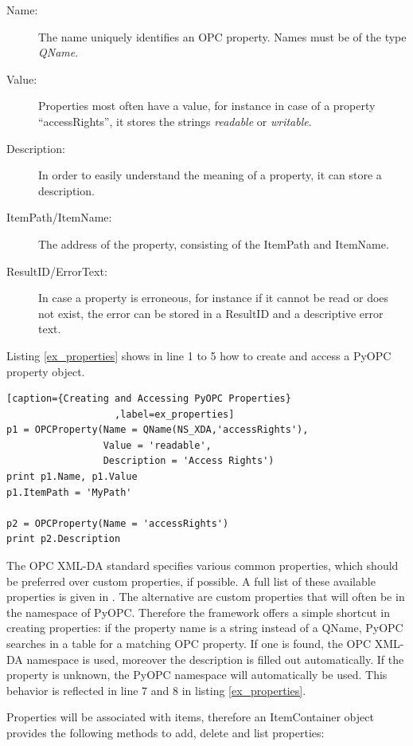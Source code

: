 \begin{description}
\item[Name:] The name uniquely identifies an OPC property. Names must
be of the type {\sl QName}.
\item[Value:] Properties most often have a value, for instance in case
of a property ``accessRights'', it stores the strings {\sl readable}
or {\sl writable}.
\item[Description:] In order to easily understand the meaning of a 
property, it can store a description.
\item[ItemPath/ItemName:] The address of the property, consisting of
the ItemPath and ItemName. 
\item[ResultID/ErrorText:] In case a property is erroneous, for
instance if it cannot be read or does not exist, the error can be
stored in a ResultID and a descriptive error text.
\end{description}

Listing \ref{ex_properties} shows in line 1 to 5 how to create and
access a PyOPC property object.

\lstset{language=C}
\begin{lstlisting}[caption={Creating and Accessing PyOPC Properties}
                   ,label=ex_properties] 
p1 = OPCProperty(Name = QName(NS_XDA,'accessRights'),
                 Value = 'readable',
                 Description = 'Access Rights')
print p1.Name, p1.Value
p1.ItemPath = 'MyPath'                 

p2 = OPCProperty(Name = 'accessRights')
print p2.Description
\end{lstlisting}

The OPC XML-DA standard specifies various common properties, which
should be preferred over custom properties, if possible. A full list
of these available properties is given in \cite{OPCXMLDA}. The alternative
are custom properties that will often be in the namespace of
PyOPC. Therefore the framework offers a simple shortcut in creating
properties: if the property name is a string instead of a QName, PyOPC
searches in a table for a matching OPC property.  If one is found, the
OPC XML-DA namespace is used, moreover the description is filled out
automatically. If the property is unknown, the PyOPC namespace will
automatically be used. This behavior is reflected in line 7 and 8 in
listing \ref{ex_properties}.

Properties will be associated with items, therefore an ItemContainer
object provides the following methods to add, delete and list
properties:

